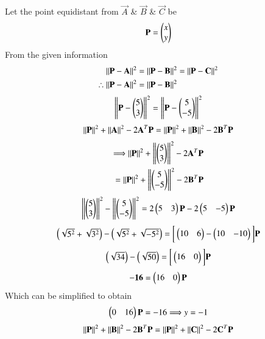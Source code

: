 \documentclass[journal,12pt,twocolumn]{IEEEtran}
\begin{document}
Let the point equidistant from $\Vec{A}$ \& $\Vec{B}$ \& $\Vec{C}$ be 
\begin{align}
    \Vec{P}=\myvec{x\\y}
\end{align}
From the given information 
\begin{align}
    \norm{\Vec{P}-\vec{A}}^2 &= \norm{\vec{P}-\vec{B}}^2 = \norm{\vec{P}-\vec{C}}^2\\
\therefore
    \norm{\Vec{P}-\vec{A}}^2 &= \norm{\vec{P}-\vec{B}}^2
\end{align}
\begin{align}
    \left\lVert\mathbf{P}-\begin{pmatrix}5\\3\end{pmatrix}\right\rVert^2 =\left\lVert\mathbf{P} - \begin{pmatrix}5\\-5\end{pmatrix}\right\rVert^2
    \end{align}
    \begin{align}
    \left\lVert\mathbf{P}\right\rVert^2 + \left\lVert\mathbf{A}\right\rVert^2 -2\mathbf{A}^T\mathbf{P} = \left\lVert\mathbf{P}\right\rVert^2 + \left\lVert\mathbf{B}\right\rVert^2 -2\mathbf{B}^T\mathbf{P}
\end{align}
\begin{align} 
    \Longrightarrow \left\lVert\mathbf{P}\right\rVert^2 + \left\lVert\begin{pmatrix}5\\3\end{pmatrix}\right\rVert^2 -2\mathbf{A}^T\mathbf{P}\\ = \left\lVert\mathbf{P}\right\rVert^2 + \left\lVert\begin{pmatrix}5\\-5\end{pmatrix}\right\rVert^2 -2\mathbf{B}^T\mathbf{P}
\end{align}
\begin{align}
    \left\lVert\begin{pmatrix}5\\3\end{pmatrix}\right\rVert^2 -\left\lVert\begin{pmatrix}5\\-5\end{pmatrix}\right\rVert^2 = 2\begin{pmatrix}5& 3\end{pmatrix}\mathbf{P} -2\begin{pmatrix}5&-5\end{pmatrix}\mathbf{P}
    \end{align}
    \begin{align}
    \begin{pmatrix}\sqrt{5^2}+\sqrt{3^2}\end{pmatrix} -\begin{pmatrix}\sqrt{5^2}+\sqrt{-5^2}\end{pmatrix} =                  \bigg[\begin{pmatrix}10&6\end{pmatrix} - \begin{pmatrix}10&-10\end{pmatrix}\bigg]\mathbf{P}
\end{align}
\begin{align}
    \begin{pmatrix}\sqrt{34}\end{pmatrix} -\begin{pmatrix}\sqrt{50}\end{pmatrix}                      =\bigg[\begin{pmatrix}16&0\end{pmatrix}\bigg]\mathbf{P}
\end{align}
\begin{align}
    \mathbf{-16} = \begin{pmatrix}16&0\end{pmatrix}\mathbf{P}
\end{align}
Which can be simplified to obtain 
\begin{align}
    \begin{pmatrix}0&16\end{pmatrix}\mathbf{P} = -16
    \Longrightarrow y = -1
\end{align}
\begin{align}
    \left\lVert\mathbf{P}\right\rVert^2 + \left\lVert\mathbf{B}\right\rVert^2 -2\mathbf{B}^T\mathbf{P} = \left\lVert\mathbf{P}\right\rVert^2 + \left\lVert\mathbf{C}\right\rVert^2 -2\mathbf{C}^T\mathbf{P}
\end{align}
\end{document}
